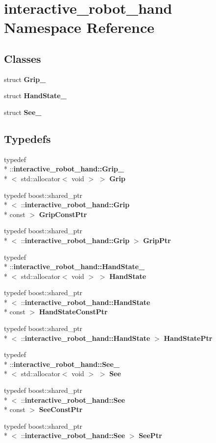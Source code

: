 \section{interactive\-\_\-robot\-\_\-hand Namespace Reference}
\label{namespaceinteractive__robot__hand}
\subsection*{Classes}
\begin{DoxyCompactItemize}
\item 
struct {\bf Grip\-\_\-}
\item 
struct {\bf Hand\-State\-\_\-}
\item 
struct {\bf See\-\_\-}
\end{DoxyCompactItemize}
\subsection*{Typedefs}
\begin{DoxyCompactItemize}
\item 
typedef \\*
\-::{\bf interactive\-\_\-robot\-\_\-hand\-::\-Grip\-\_\-}\\*
$<$ std\-::allocator$<$ void $>$ $>$ {\bf Grip}
\item 
typedef boost\-::shared\-\_\-ptr\\*
$<$ \-::{\bf interactive\-\_\-robot\-\_\-hand\-::\-Grip} \\*
const  $>$ {\bf Grip\-Const\-Ptr}
\item 
typedef boost\-::shared\-\_\-ptr\\*
$<$ \-::{\bf interactive\-\_\-robot\-\_\-hand\-::\-Grip} $>$ {\bf Grip\-Ptr}
\item 
typedef \\*
\-::{\bf interactive\-\_\-robot\-\_\-hand\-::\-Hand\-State\-\_\-}\\*
$<$ std\-::allocator$<$ void $>$ $>$ {\bf Hand\-State}
\item 
typedef boost\-::shared\-\_\-ptr\\*
$<$ \-::{\bf interactive\-\_\-robot\-\_\-hand\-::\-Hand\-State} \\*
const  $>$ {\bf Hand\-State\-Const\-Ptr}
\item 
typedef boost\-::shared\-\_\-ptr\\*
$<$ \-::{\bf interactive\-\_\-robot\-\_\-hand\-::\-Hand\-State} $>$ {\bf Hand\-State\-Ptr}
\item 
typedef \\*
\-::{\bf interactive\-\_\-robot\-\_\-hand\-::\-See\-\_\-}\\*
$<$ std\-::allocator$<$ void $>$ $>$ {\bf See}
\item 
typedef boost\-::shared\-\_\-ptr\\*
$<$ \-::{\bf interactive\-\_\-robot\-\_\-hand\-::\-See} \\*
const  $>$ {\bf See\-Const\-Ptr}
\item 
typedef boost\-::shared\-\_\-ptr\\*
$<$ \-::{\bf interactive\-\_\-robot\-\_\-hand\-::\-See} $>$ {\bf See\-Ptr}
\end{DoxyCompactItemize}
